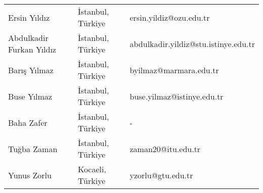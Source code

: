 {\begin{longtable}[c]{@{}lll@{}}
Ersin Yıldız & İstanbul, Türkiye & ersin.yildiz@ozu.edu.tr \\
\rowcolor[HTML]{C0C0C0} 
Abdulkadir Furkan Yıldız & İstanbul, Türkiye & abdulkadir.yildiz@stu.istinye.edu.tr \\
Barış Yılmaz & İstanbul, Türkiye & byilmaz@marmara.edu.tr \\
\rowcolor[HTML]{C0C0C0} 
Buse Yılmaz & İstanbul, Türkiye & buse.yilmaz@istinye.edu.tr \\
Baha Zafer & İstanbul, Türkiye & - \\
\rowcolor[HTML]{C0C0C0} 
Tuğba Zaman & İstanbul, Türkiye & zaman20@itu.edu.tr \\
Yunus Zorlu & Kocaeli, Türkiye & yzorlu@gtu.edu.tr \\* \bottomrule
\end{longtable}
}
